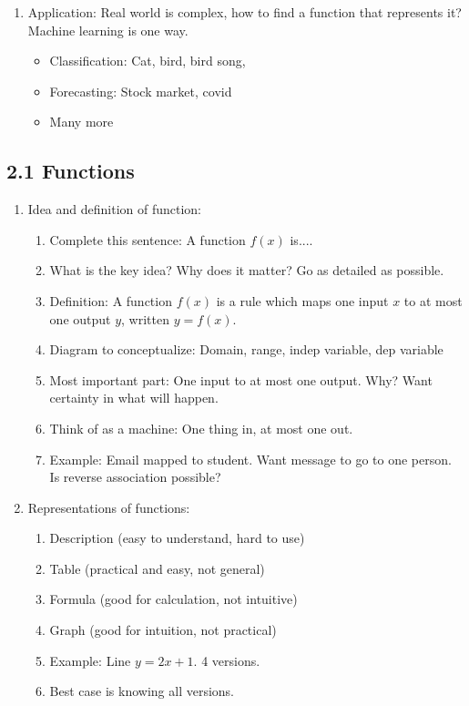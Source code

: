\documentclass{article}
\begin{document}
\begin{enumerate}
\item Application: Real world is complex, how to find a function that represents it? Machine learning is one way.
\begin{itemize}
\item Classification: Cat, bird, bird song, 
\item Forecasting: Stock market, covid
\item Many more
\end{itemize}
\end{enumerate}

\subsection{2.1 Functions}

\begin{enumerate}

\item Idea and definition of function:
\begin{enumerate}
\item Complete this sentence: A function $f(x)$ is....
\item What is the key idea? Why does it matter? Go as detailed as possible.
\item Definition: A function $f(x)$ is a rule which maps one input $x$ to at most one output $y$, written $y=f(x)$.
\item Diagram to conceptualize: Domain, range, indep variable, dep variable
\item Most important part: One input to at most one output. Why? Want certainty in what will happen.
\item Think of as a machine: One thing in, at most one out.
\item Example: Email mapped to student. Want message to go to one person. Is reverse association possible?
\end{enumerate}

\item Representations of functions:
\begin{enumerate}
\item Description (easy to understand, hard to use)
\item Table (practical and easy, not general)
\item Formula (good for calculation, not intuitive)
\item Graph (good for intuition, not practical)
\item Example: Line $y = 2x+1$. 4 versions. 
\item Best case is knowing all versions.
\end{enumerate}



\end{enumerate}
\end{document}

